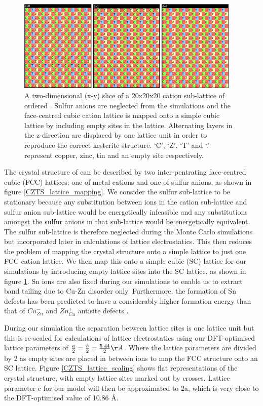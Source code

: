 \begin{figure}[h!]
  \centering
    \includegraphics[width=0.95\textwidth]{figures/eris_config_eg.png}
    \caption{A two-dimensional (x-y) slice of a 20x20x20 cation sub-lattice of ordered { \CZTS }. Sulfur anions are neglected from the simulations and the face-centred cubic cation lattice is mapped onto a simple cubic lattice by including empty sites in the lattice. Alternating layers in the z-direction are displaced by one lattice unit in order to reproduce the correct kesterite structure. `C', `Z', `T' and `.' represent copper, zinc, tin and an empty site respectively.}
  \label{eris_config_eg}
\end{figure}

The crystal structure of {\CZTS } can be described by two inter-pentrating face-centred cubic (FCC) lattices: one of metal cations and one of sulfur anions, as shown in figure \ref{CZTS_lattice_mapping}. We consider the sulfur sub-lattice to be stationary because any substitution between ions in the cation sub-lattice and sulfur anion sub-lattice would be energetically infeasible and any substitutions amongst the sulfur anions in that sub-lattice would be energetically equivalent. The sulfur sub-lattice is therefore neglected during the Monte Carlo simulations but incorporated later in calculations of lattice electrostatics. This then reduces the problem of mapping the {\CZTS } crystal structure onto a simple lattice to just one FCC cation lattice. We then map this onto a simple cubic (SC) lattice for our simulations by introducing empty lattice sites into the SC lattice, as shown in figure \ref{eris_config_eg}. Sn ions are also fixed during our simulations to enable us to extract band tailing due to Cu-Zn disorder only. Furthermore, the formation of Sn defects has been predicted to have a considerably higher formation energy than that of $Cu_{Zn}^-$ and $Zn_{Cu}^+$ antisite defects \cite{defect1}.

During our simulation the separation between lattice sites is one lattice unit but this is re-scaled for calculations of lattice electrostatics using our DFT-optimised lattice parameters of $\frac{a}{2}  = \frac{b}{2} = \frac{5.44}{2} \AA$. Where the lattice parameters are divided by 2 as empty sites are placed in between ions to map the FCC structure onto an SC lattice. Figure \ref{CZTS_lattice_scaling} shows flat representations of the crystal structure, with empty lattice sites marked out by crosses. Lattice parameter c for our model will then be approximated to 2a, which is very close to the DFT-optimised value of 10.86 \AA .  

